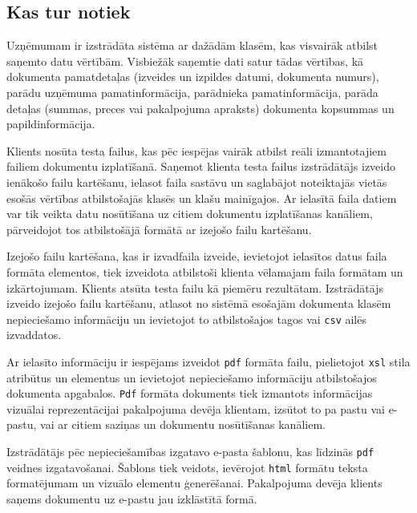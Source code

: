 \subsection{Kas tur notiek}
\par Uzņēmumam ir izstrādāta sistēma ar dažādām klasēm, kas visvairāk atbilst saņemto datu vērtībām. Visbiežāk saņemtie dati satur tādas vērtības, kā dokumenta pamatdetaļas (izveides un izpildes datumi, dokumenta numurs), parādu uzņēmuma pamatinformācija, parādnieka pamatinformācija, parāda detaļas (summas, preces vai pakalpojuma apraksts) dokumenta kopsummas un papildinformācija.
\par Klients nosūta testa failus, kas pēc iespējas vairāk atbilst reāli izmantotajiem failiem dokumentu izplatīšanā. Saņemot klienta testa failus izstrādātājs izveido ienākošo failu kartēšanu, ielasot faila sastāvu un saglabājot noteiktajās vietās esošās vērtības atbilstošajās klasēs un klašu mainīgajos. Ar ielasītā faila datiem var tik veikta datu nosūtīšana uz citiem dokumentu izplatīšanas kanāliem, pārveidojot tos atbilstošājā formātā ar izejošo failu kartēšanu.
\par Izejošo failu kartēšana, kas ir izvadfaila izveide, ievietojot ielasītos datus faila formāta elementos, tiek izveidota atbilstoši klienta vēlamajam faila formātam un izkārtojumam. Klients atsūta testa failu kā piemēru rezultātam. Izstrādātājs izveido izejošo failu kartēšanu, atlasot no sistēmā esošajām dokumenta klasēm nepieciešamo informāciju un ievietojot to atbilstošajos tagos vai \texttt{csv} ailēs izvaddatos.
\par Ar ielasīto informāciju ir iespējams izveidot \texttt{pdf} formāta failu, pielietojot \texttt{xsl} stila atribūtus un elementus un ievietojot nepieciešamo informāciju atbilstošajos dokumenta apgabalos. \texttt{Pdf} formāta dokuments tiek izmantots informācijas vizuālai reprezentācijai pakalpojuma devēja klientam, izsūtot to pa pastu vai e-pastu, vai ar citiem saziņas un dokumentu nosūtīšanas kanāliem.
\par Izstrādātājs pēc nepieciešamības izgatavo e-pasta šablonu, kas līdzinās \texttt{pdf} veidnes izgatavošanai. Šablons tiek veidots, ievērojot \texttt{html} formātu teksta formatējumam un vizuālo elementu ģenerēšanai. Pakalpojuma devēja klients saņems dokumentu uz e-pastu jau izklāstītā formā.



